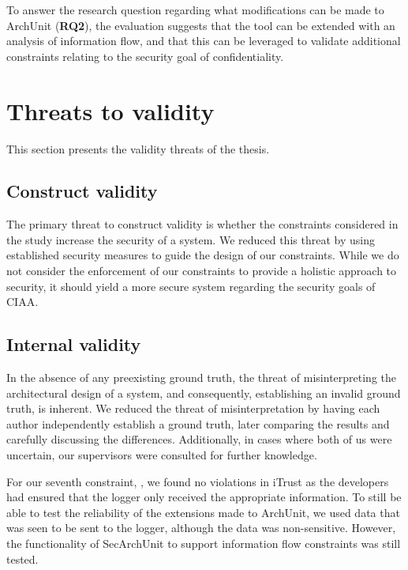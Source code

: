 To answer the research question regarding what modifications can be made to ArchUnit (\textbf{RQ2}), the evaluation suggests that the tool can be extended with an analysis of information flow, and that this can be leveraged to validate additional constraints relating to the security goal of confidentiality.



\section{Threats to validity}
This section presents the validity threats of the thesis. 

\subsection{Construct validity}
The primary threat to construct validity is whether the constraints considered in the study increase the security of a system. We reduced this threat by using established security measures to guide the design of our constraints. While we do not consider the enforcement of our constraints to provide a holistic approach to security, it should yield a more secure system regarding the security goals of CIAA.


\subsection{Internal validity}
In the absence of any preexisting ground truth, the threat of misinterpreting the architectural design of a system, and consequently, establishing an invalid ground truth, is inherent. We reduced the threat of misinterpretation by having each author independently establish a ground truth, later comparing the results and carefully discussing the differences. Additionally, in cases where both of us were uncertain, our supervisors were consulted for further knowledge.


For our seventh constraint, , we found no violations in iTrust as the developers had ensured that the logger only received the appropriate information. To still be able to test the reliability of the extensions made to ArchUnit, we used data that was seen to be sent to the logger, although the data was non-sensitive. However, the functionality of SecArchUnit to support information flow constraints was still tested. 

